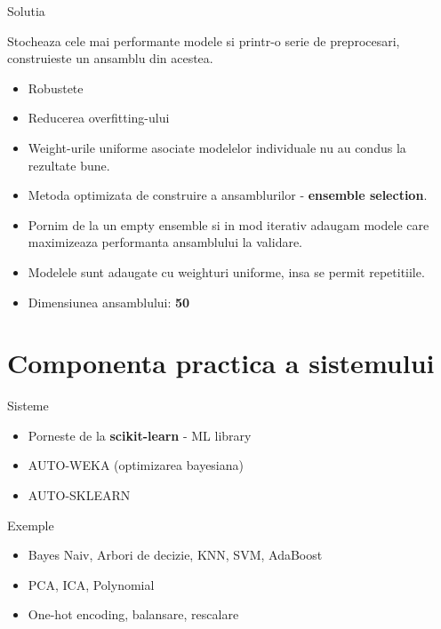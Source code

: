 \documentclass{beamer}
\begin{document}
	\begin{frame}{Solutia}
		\begin{center}
			Stocheaza cele mai performante modele si printr-o serie de preprocesari, construieste un ansamblu din acestea.
			\begin{itemize}
				\item Robustete
				\item Reducerea overfitting-ului
			\end{itemize}
		\end{center}	
	\end{frame}

	\begin{frame}
		\begin{itemize}
			\item Weight-urile uniforme asociate modelelor individuale nu au condus la rezultate bune.
			\item Metoda optimizata de construire a ansamblurilor - \textbf{ensemble selection}.
			\item Pornim de la un empty ensemble si in mod iterativ adaugam modele care maximizeaza performanta ansamblului la validare. 
			\item Modelele sunt adaugate cu weighturi uniforme, insa se permit repetitiile.
			\item Dimensiunea ansamblului: \textbf{50}
		\end{itemize}
	\end{frame}

\section{Componenta practica a sistemului}

	\begin{frame}{Sisteme}
		\begin{itemize}
			\item Porneste de la \textbf{scikit-learn} - ML library
			\item AUTO-WEKA (optimizarea bayesiana)
			\item AUTO-SKLEARN
		\end{itemize}
	\end{frame}

	\begin{frame}{Exemple}
		\begin{itemize}
			\item Bayes Naiv, Arbori de decizie, KNN, SVM, AdaBoost
		\end{itemize}
		
		\begin{itemize}
			\item PCA, ICA, Polynomial
		\end{itemize}

		\begin{itemize}
			\item One-hot encoding, balansare, rescalare
		\end{itemize}
	\end{frame}
	
\end{document}
